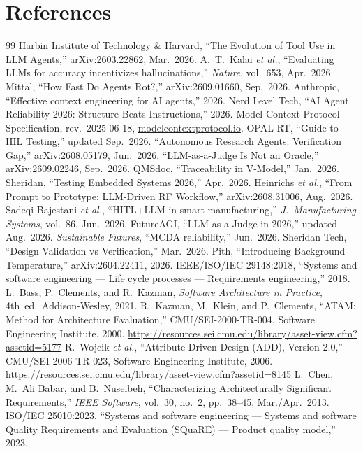 \documentclass[11pt,a4paper]{article}
\begin{document}
\appendix
\section*{References}
\label{sec:references}

\begin{thebibliography}{99}\small
{} Harbin Institute of Technology \& Harvard, ``The Evolution of Tool Use in LLM Agents,'' arXiv:2603.22862, Mar.\ 2026.
 A.\ T.\ Kalai \emph{et al.}, ``Evaluating LLMs for accuracy incentivizes hallucinations,'' \emph{Nature}, vol.\ 653, Apr.\ 2026.
 Mittal, ``How Fast Do Agents Rot?,'' arXiv:2609.01660, Sep.\ 2026.
 Anthropic, ``Effective context engineering for AI agents,'' 2026.
 Nerd Level Tech, ``AI Agent Reliability 2026: Structure Beats Instructions,'' 2026.
 Model Context Protocol Specification, rev.\ 2025-06-18, \url{modelcontextprotocol.io}.
 OPAL-RT, ``Guide to HIL Testing,'' updated Sep.\ 2026.
 ``Autonomous Research Agents: Verification Gap,'' arXiv:2608.05179, Jun.\ 2026.
 ``LLM-as-a-Judge Is Not an Oracle,'' arXiv:2609.02246, Sep.\ 2026.
 QMSdoc, ``Traceability in V-Model,'' Jan.\ 2026.
 Sheridan, ``Testing Embedded Systems 2026,'' Apr.\ 2026.
 Heinrichs \emph{et al.}, ``From Prompt to Prototype: LLM-Driven RF Workflow,'' arXiv:2608.31006, Aug.\ 2026.
 Sadeqi Bajestani \emph{et al.}, ``HITL+LLM in smart manufacturing,'' \emph{J.\ Manufacturing Systems}, vol.\ 86, Jun.\ 2026.
 FutureAGI, ``LLM-as-a-Judge in 2026,'' updated Aug.\ 2026.
 \emph{Sustainable Futures}, ``MCDA reliability,'' Jun.\ 2026.
 Sheridan Tech, ``Design Validation vs Verification,'' Mar.\ 2026.
 Pith, ``Introducing Background Temperature,'' arXiv:2604.22411, 2026.
 IEEE/ISO/IEC 29148:2018, ``Systems and software engineering --- Life cycle processes --- Requirements engineering,'' 2018.
 L.~Bass, P.~Clements, and R.~Kazman, \emph{Software Architecture in Practice}, 4th~ed.\ Addison-Wesley, 2021.
 R.~Kazman, M.~Klein, and P.~Clements, ``ATAM: Method for Architecture Evaluation,'' CMU/SEI-2000-TR-004, Software Engineering Institute, 2000. \url{https://resources.sei.cmu.edu/library/asset-view.cfm?assetid=5177}
 R.~Wojcik \emph{et al.}, ``Attribute-Driven Design (ADD), Version 2.0,'' CMU/SEI-2006-TR-023, Software Engineering Institute, 2006. \url{https://resources.sei.cmu.edu/library/asset-view.cfm?assetid=8145}
 L.~Chen, M.~Ali Babar, and B.~Nuseibeh, ``Characterizing Architecturally Significant Requirements,'' \emph{IEEE Software}, vol.~30, no.~2, pp.~38--45, Mar./Apr.\ 2013.
 ISO/IEC 25010:2023, ``Systems and software engineering --- Systems and software Quality Requirements and Evaluation (SQuaRE) --- Product quality model,'' 2023.
\end{thebibliography}
\end{document}
